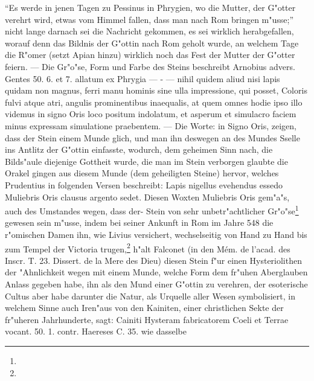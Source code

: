 \documentclass[a4paper, 11pt, oneside, polutonikogreek, german]{article}
\begin{document}
"`Es werde in jenen Tagen zu Pessinus in Phrygien, wo die Mutter, der G"otter verehrt wird, etwas vom Himmel fallen, dass man nach Rom bringen m"usse;"' nicht lange darnach sei die Nachricht gekommen, es sei wirklich herabgefallen, worauf denn das Bildnis der G"ottin nach Rom geholt wurde, an welchem Tage die R"omer (setzt Apian hinzu) wirklich noch das Fest der Mutter der G"otter feiern. --- Die Gr"o"se, Form und Farbe des Steins beschreibt Arnobius advers. Gentes 50. 6. et 7. allatum ex Phrygia --- - --- nihil quidem aliud nisi lapis quidam non magnus, ferri manu hominis sine ulla impressione, qui posset, Coloris fulvi atque atri, angulis prominentibus inaequalis, at quem omnes hodie ipso illo videmus in signo Oris loco positum indolatum, et asperum et simulacro faciem minus expressam simulatione praebentem. --- Die Worte: in Signo Oris, zeigen, dass der Stein einem Munde glich, und man ihn deswegen an des Mundes Sselle ins Antlitz der G"ottin einfasste, wodurch, dem geheimen Sinn nach, die Bilds"aule diejenige Gottheit wurde, die man im Stein verborgen glaubte die Orakel gingen aus diesem Munde (dem geheiligten Steine) hervor, welches Prudentius in folgenden Versen beschreibt: Lapis nigellus evehendus essedo Muliebris Oris clausus argento sedet. Diesen Woxten Muliebris Oris gem"a"s, auch des Umstandes wegen, dass der- Stein von sehr unbetr"achtlicher Gr"o"se\footnote{} gewesen sein m"usse, indem bei seiner Ankunft in Rom im Jahre 548 die r"omischen Damen ihn, wie Livius versichert, wechselseitig von Hand zu Hand bis zum Tempel der Victoria trugen,\footnote{} h"alt Falconet (in den Mém. de l'acad. des Inscr. T. 23. Dissert. de la Mere des Dieu) diesen Stein f"ur einen Hysteriolithen der "Ahnlichkeit wegen mit einem Munde, welche Form dem fr"uhen Aberglauben Anlass gegeben habe, ihn als den Mund einer G"ottin zu verehren, der esoterische Cultus aber habe darunter die Natur, als Urquelle aller Wesen symbolisiert, in welchem Sinne auch Iren"aus von den Kainiten, einer christlichen Sekte der fr"uheren Jahrhunderte, sagt: Cainiti Hysteram fabricatorem Coeli et Terrae vocant. 50. 1. contr. Haereses C. 35. wie dasselbe 
\end{document}
